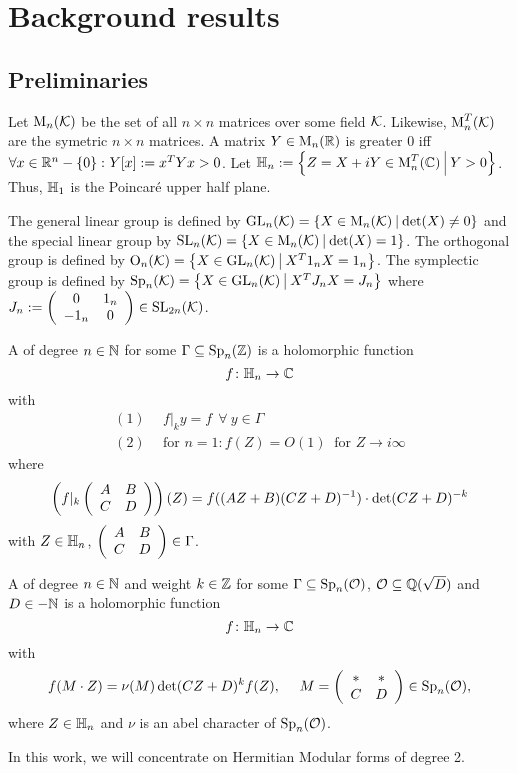 
\section{Background results}

\subsection{Preliminaries}

Let $\operatorname{M}_n(\mathcal{K})$ be the set of all $n \times n$ matrices over some field $\mathcal{K}$.
Likewise, $\operatorname{M}_n^T(\mathcal{K})$ are the symetric $n \times n$ matrices.
A matrix $Y \in \operatorname{M}_n(\mathbb{R})$ is greater $0$ iff $\forall x \in \R^n - \Set{0} \colon Y[x] := x^T Y x > 0$.
Let $\HalfPlane_n := \Set{Z = X + iY \in \M_n^T(\C)}{Y > 0}$.
Thus, $\mathbb{H}_1$ is the Poincaré upper half plane.

The general linear group is defined by $\GL_n(\K) = \Set{X \in \M_n(\K)}{\det(X) \neq 0}$
and the special linear group by $\SL_n(\K) = \Set{X \in \M_n(\K)}{\det(X) = 1}$. %
The orthogonal group is defined by $\Orth_n(\K) = \Set{X \in \GL_n(\K)}{X^T 1_n X = 1_n}$. %
The symplectic group is defined by $\Sp_n(\K) = \Set{X \in \GL_n(\K)}{X^T J_n X = J_n}$ %
where $J_n := \left( \begin{array}{cc} 0 & 1_n \\ -1_n & 0 \end{array} \right) \in \operatorname{SL}_{2n}(\mathcal{K})$. %

A  of degree $n\in\mathbb{N}$ for some $\Gamma \subseteq \operatorname{Sp}_n(\mathbb{Z})$ is a holomorphic function
\[ f \colon \mathbb{H}_n \rightarrow \mathbb{C} \]
with
\begin{align*}
(1) \ \ & f |_k y = f \ \ \forall \ y \in \Gamma \\
(2) \ \ & \text{for } n = 1 \colon f(Z) = O(1) \ \text{ for } Z \rightarrow i \infty
\end{align*}
where
\[ \left( f|_k \left( \begin{array}{cc} A & B \\ C & D \end{array} \right) \right) (Z) =
f((AZ + B)(CZ + D)^{-1}) \cdot \det(CZ + D)^{-k} \]
with $Z \in \mathbb{H}_n$, $\left( \begin{array}{cc} A & B \\ C & D \end{array} \right) \in \Gamma$.

A  of degree $n\in\mathbb{N}$ and weight $k\in \mathbb{Z}$ for some $\Gamma \subseteq \operatorname{Sp}_n(\mathcal{O})$, $\mathcal{O} \subseteq \mathbb{Q}(\sqrt{D})$ and $D \in -\mathbb{N}$  is a holomorphic function
\[ f \colon \mathbb{H}_n \rightarrow \mathbb{C} \]
with
\[ f(M \cdot Z) = \nu(M) \det(CZ + D)^k f(Z), \ \ \ \ M = \left( \begin{array}{cc} * & * \\ C & D \end{array} \right) \in \operatorname{Sp}_n(\mathcal{O}) , \]
where $Z \in \mathbb{H}_n$ and $\nu$ is an abel character of $\operatorname{Sp}_n(\mathcal{O})$.

In this work, we will concentrate on Hermitian Modular forms of degree 2.
